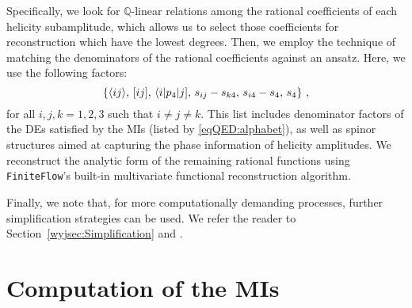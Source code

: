 \documentclass[main.tex]{subfiles}
\begin{document}
Specifically, we look for $\mathbb{Q}$-linear relations among the rational
coefficients of each helicity subamplitude, which allows us to select those coefficients for reconstruction which have the lowest degrees. Then, we employ the technique of matching the denominators of the rational coefficients against an ansatz. Here, we use the following factors:
\begin{equation}
	\left\{\langle ij \rangle , \, [ ij ] , \, \langle i|p_4|j] , \, s_{ij} - s_{k4} , \, s_{i4} - s_4 , \, s_4 \right\} \,,
\end{equation}
for all $i, j, k = 1, 2, 3$ such that $i\neq j \neq k$. This list includes denominator factors of the DEs satisfied by the MIs (listed by \cref{eqQED:alphabet}), 
as well as spinor structures aimed at capturing the phase information of helicity amplitudes.
We reconstruct the analytic form of the remaining rational functions using \texttt{FiniteFlow}'s built-in multivariate functional reconstruction algorithm.

Finally, we note that, for more computationally demanding processes, further simplification strategies can be used. We refer the reader to Section~\ref{wyjsec:Simplification} and .

\section{Computation of the \aclp{MI}}
\label{secQED:spec-fns}
\end{document}
